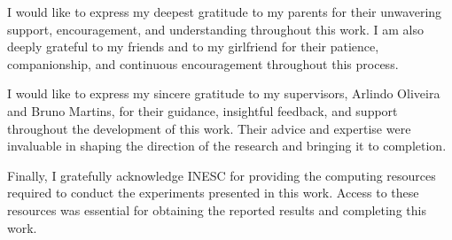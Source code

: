 
I would like to express my deepest gratitude to my parents for their unwavering support, encouragement, and understanding throughout this work. I am also deeply grateful to my friends and to my girlfriend for their patience, companionship, and continuous encouragement throughout this process.

I would like to express my sincere gratitude to my supervisors, Arlindo Oliveira and Bruno Martins, for their guidance, insightful feedback, and support throughout the development of this work. Their advice and expertise were invaluable in shaping the direction of the research and bringing it to completion.

Finally, I gratefully acknowledge INESC for providing the computing resources required to conduct the experiments presented in this work. Access to these resources was essential for obtaining the reported results and completing this work.
